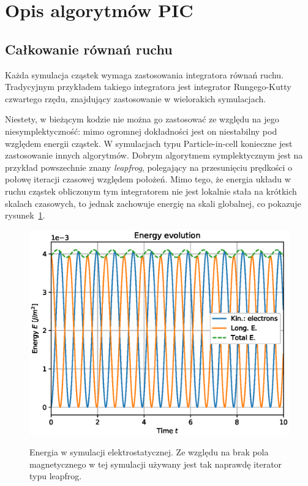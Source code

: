 \section[Opis algorytmów PIC]{Opis algorytmów PIC}%
\subsection{Całkowanie równań ruchu}
Każda symulacja cząstek wymaga zastosowania integratora równań ruchu.
Tradycyjnym przykładem takiego integratora jest integrator Rungego-Kutty
czwartego rzędu, znajdujący zastosowanie w wielorakich symulacjach.

Niestety, w bieżącym kodzie nie można go zastosować ze względu na jego
niesymplektyczność: mimo ogromnej dokładności jest on niestabilny pod
względem energii cząstek\cite{computational-physics}. W symulacjach typu
Particle-in-cell konieczne jest zastosowanie innych algorytmów. Dobrym
algorytmem symplektycznym jest na przykład powszechnie znany
\emph{leapfrog}, polegający na przesunięciu prędkości o połowę iteracji
czasowej względem położeń.\cite{computational-physics} Mimo tego, że energia
układu w ruchu cząstek obliczonym tym integratorem nie jest lokalnie stała na
krótkich skalach czasowych, to jednak zachowuje energię na skali globalnej, co
pokazuje rysunek~\ref{fig:ESE-energy}.

\begin{figure}[h!]
  \includegraphics{Images/ESE_energy_plot}
  \label{fig:ESE-energy}
  \caption{Energia w symulacji elektrostatycznej. Ze względu na brak pola magnetycznego
  w tej symulacji używany jest tak naprawdę iterator typu leapfrog.}
\end{figure}

